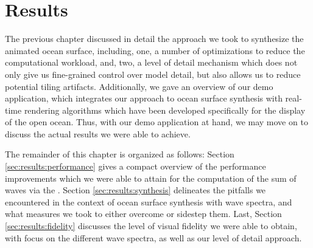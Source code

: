 \chapter{Results}
\label{ch:results}
%

The previous chapter discussed in detail the approach we took to synthesize
the animated ocean surface, including, one, a number of optimizations to reduce
the computational workload, and, two, a level of detail mechanism which does
not only give us fine-grained control over model detail, but also allows us to
reduce potential tiling artifacts. Additionally, we gave an overview of our demo
application, which integrates our approach to ocean surface synthesis
with real-time rendering algorithms which have been developed specifically for
the display of the open ocean.
Thus, with our demo application at hand, we may move on to discuss the
actual results we were able to achieve.

The remainder of this chapter is organized as follows:
Section \ref{sec:results:performance} gives a compact overview of the performance
improvements which we were able to attain for the computation of the sum
of waves via the \InvFourierTransform.
Section \ref{sec:results:synthesis} delineates the pitfalls we encountered
in the context of ocean surface synthesis with wave spectra, and what measures
we took to either overcome or sidestep them.
Last, Section \ref{sec:results:fidelity} discusses the level of visual fidelity
we were able to obtain, with focus on the different wave spectra, as well as
our level of detail approach.


